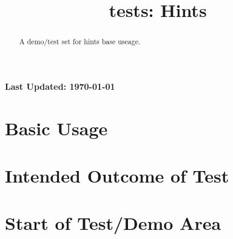 \documentclass{ximera}
\title{tests: Hints}
\begin{document}
\begin{abstract}
    A demo/test set for hints base useage.
\end{abstract}
\maketitle

{{\Huge \bfseries Last Updated: \today}} \\


\section{Basic Usage}


\section{Intended Outcome of Test}


\section{Start of Test/Demo Area}


\hrulefill
\end{document}
